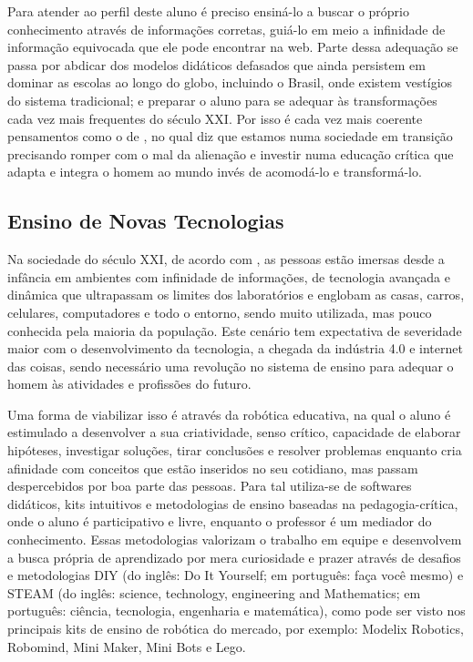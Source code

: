 Para atender ao perfil deste aluno é preciso ensiná-lo a buscar o próprio conhecimento através de informações corretas, guiá-lo em meio a infinidade de informação equivocada que ele pode encontrar na web. Parte dessa adequação se passa por abdicar dos modelos didáticos defasados que ainda persistem em dominar as escolas ao longo do globo, incluindo o Brasil, onde existem vestígios do sistema tradicional; e preparar o aluno para se adequar às transformações cada vez mais frequentes do século XXI. Por isso é cada vez mais coerente pensamentos como o de \cite{freire}, no qual diz que estamos numa sociedade em transição precisando romper com o mal da alienação e investir numa educação crítica que adapta e integra o homem ao mundo invés de acomodá-lo e transformá-lo. 

\subsection{Ensino de Novas Tecnologias}\label{sec:ens_novas_tecn}
Na sociedade do século XXI, de acordo com \cite{benitti}, as pessoas estão imersas desde a infância em ambientes com infinidade de informações, de tecnologia avançada e dinâmica que ultrapassam os limites dos laboratórios e englobam as casas, carros, celulares, computadores e todo o entorno, sendo  muito utilizada, mas pouco conhecida pela maioria da população. Este cenário tem expectativa de severidade maior com o desenvolvimento da tecnologia, a chegada da indústria 4.0 e internet das coisas, sendo necessário uma revolução no sistema de ensino para adequar o homem às atividades e profissões do futuro.

Uma forma de viabilizar isso é através da robótica educativa, na qual o aluno é estimulado a desenvolver a sua criatividade, senso crítico, capacidade de elaborar hipóteses, investigar soluções, tirar conclusões e resolver problemas enquanto cria afinidade com conceitos que estão inseridos no seu cotidiano, mas passam despercebidos por boa parte das pessoas. Para tal utiliza-se de softwares didáticos, kits intuitivos e metodologias de ensino baseadas na pedagogia-crítica, onde o aluno é participativo e livre, enquanto o professor é um mediador do conhecimento. Essas metodologias valorizam o trabalho em equipe e desenvolvem a busca própria de aprendizado por mera curiosidade e prazer através de desafios e metodologias DIY (do inglês: Do It Yourself; em português: faça você mesmo) e STEAM (do inglês: science, technology, engineering and Mathematics; em português: ciência, tecnologia, engenharia e matemática), como pode ser visto nos principais kits de ensino de robótica do mercado, por exemplo: Modelix Robotics, Robomind, Mini Maker, Mini Bots e Lego.

